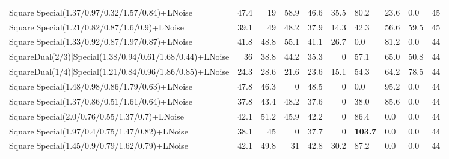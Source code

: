 \begin{tabular}{lrrrrrlllr}
 Square|Special(1.37/0.97/0.32/1.57/0.84)+LNoise                 &            47.4 &            19   &            58.9 &            46.6 &           35.5 & 80.2            & 23.6           & 0.0            &           45 \\
 Square|Special(1.21/0.82/0.87/1.6/0.9)+LNoise                   &            39.1 &            49   &            48.2 &            37.9 &           14.3 & 42.3            & 56.6           & 59.5           &           45 \\
 Square|Special(1.33/0.92/0.87/1.97/0.87)+LNoise                 &            41.8 &            48.8 &            55.1 &            41.1 &           26.7 & 0.0             & 81.2           & 0.0            &           44 \\
 SquareDual(2/3)|Special(1.38/0.94/0.61/1.68/0.44)+LNoise        &            36   &            38.8 &            44.2 &            35.3 &            0   & 57.1            & 65.0           & 50.8           &           44 \\
 SquareDual(1/4)|Special(1.21/0.84/0.96/1.86/0.85)+LNoise        &            24.3 &            28.6 &            21.6 &            23.6 &           15.1 & 54.3            & 64.2           & 78.5           &           44 \\
 Square|Special(1.48/0.98/0.86/1.79/0.63)+LNoise                 &            47.8 &            46.3 &             0   &            48.5 &            0   & 0.0             & 95.2           & 0.0            &           44 \\
 Square|Special(1.37/0.86/0.51/1.61/0.64)+LNoise                 &            37.8 &            43.4 &            48.2 &            37.6 &            0   & 38.0            & 85.6           & 0.0            &           44 \\
 Square|Special(2.0/0.76/0.55/1.37/0.7)+LNoise                   &            42.1 &            51.2 &            45.9 &            42.2 &            0   & 86.4            & 0.0            & 0.0            &           44 \\
 Square|Special(1.97/0.4/0.75/1.47/0.82)+LNoise                  &            38.1 &            45   &             0   &            37.7 &            0   & \textbf{103.7}  & 0.0            & 0.0            &           44 \\
 Square|Special(1.45/0.9/0.79/1.62/0.79)+LNoise                  &            42.1 &            49.8 &            31   &            42.8 &           30.2 & 87.2            & 0.0            & 0.0            &           44 \\

\end{tabular}
